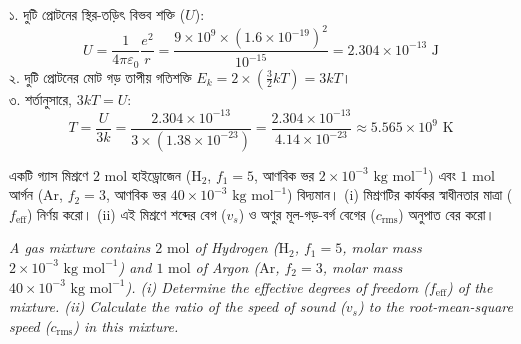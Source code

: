 \documentclass[12pt, a4paper]{article}
\begin{document}
{%
\begin{tcolorbox}[solutionbox={সমাধান (Solution)}]
\noindent
১. দুটি প্রোটনের স্থির-তড়িৎ বিভব শক্তি ($U$):
\[ U = \frac{1}{4\pi\varepsilon_0} \frac{e^2}{r} = \frac{9 \times 10^9 \times (1.6 \times 10^{-19})^2}{10^{-15}} = 2.304 \times 10^{-13}\text{ J} \]
২. দুটি প্রোটনের মোট গড় তাপীয় গতিশক্তি $E_k = 2 \times \left(\frac{3}{2} k T\right) = 3 k T$। \\
৩. শর্তানুসারে, $3 k T = U$:
\[ T = \frac{U}{3 k} = \frac{2.304 \times 10^{-13}}{3 \times (1.38 \times 10^{-23})} = \frac{2.304 \times 10^{-13}}{4.14 \times 10^{-23}} \approx 5.565 \times 10^9\text{ K} \]
\end{tcolorbox}

\vspace{1.5em}
\begin{tcolorbox}[questionbox={প্রশ্ন (Question) 3}]
\noindent
একটি গ্যাস মিশ্রণে $2\text{ mol}$ হাইড্রোজেন ($\text{H}_2$, $f_1 = 5$, আণবিক ভর $2 \times 10^{-3}\text{ kg mol}^{-1}$) এবং $1\text{ mol}$ আর্গন ($\text{Ar}$, $f_2 = 3$, আণবিক ভর $40 \times 10^{-3}\text{ kg mol}^{-1}$) বিদ্যমান। (i) মিশ্রণটির কার্যকর স্বাধীনতার মাত্রা ($f_{\text{eff}}$) নির্ণয় করো। (ii) এই মিশ্রণে শব্দের বেগ ($v_s$) ও অণুর মূল-গড়-বর্গ বেগের ($c_{\text{rms}}$) অনুপাত বের করো।

\vspace{0.8em}
\begin{english}
\noindent\textit{\color{darkgray}
A gas mixture contains $2\text{ mol}$ of Hydrogen ($\text{H}_2$, $f_1 = 5$, molar mass $2 \times 10^{-3}\text{ kg mol}^{-1}$) and $1\text{ mol}$ of Argon ($\text{Ar}$, $f_2 = 3$, molar mass $40 \times 10^{-3}\text{ kg mol}^{-1}$). (i) Determine the effective degrees of freedom ($f_{\text{eff}}$) of the mixture. (ii) Calculate the ratio of the speed of sound ($v_s$) to the root-mean-square speed ($c_{\text{rms}}$) in this mixture.
}
\end{english}
\end{tcolorbox}

\vspace{1em}

}
\end{document}
